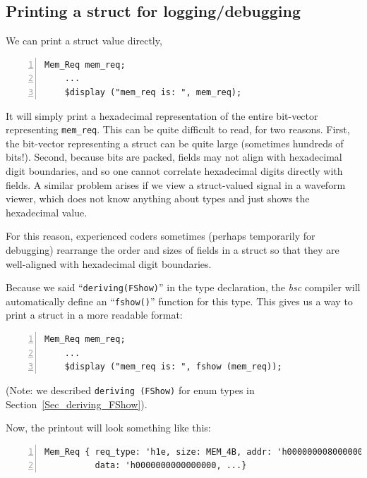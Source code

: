 
\subsection{Printing a struct for logging/debugging}

We can print a struct value directly, {\eg}

{\footnotesize
\begin{Verbatim}[frame=single, numbers=left]
    Mem_Req mem_req;
    ...
    $display ("mem_req is: ", mem_req);
\end{Verbatim}
}

It will simply print a hexadecimal representation of the entire
bit-vector representing {\tt mem\_req}.  This can be quite difficult
to read, for two reasons.  First, the bit-vector representing a struct
can be quite large (sometimes hundreds of bits!).  Second, because
bits are packed, fields may not align with hexadecimal digit
boundaries, and so one cannot correlate hexadecimal digits directly
with fields.  A similar problem arises if we view a struct-valued
signal in a waveform viewer, which does not know anything about {\BSV}
types and just shows the hexadecimal value.

For this reason, experienced {\BSV} coders sometimes (perhaps
temporarily for debugging) rearrange the order and sizes of fields in
a struct so that they are well-aligned with hexadecimal digit
boundaries.


Because we said ``\verb|deriving(FShow)|'' in the type declaration,
the \emph{bsc} compiler will automatically define an
``\verb|fshow()|'' function for this type.  This gives us a way to
print a struct in a more readable format:

{\footnotesize
\begin{Verbatim}[frame=single, numbers=left]
    Mem_Req mem_req;
    ...
    $display ("mem_req is: ", fshow (mem_req));
\end{Verbatim}
}

{\footnotesize
(Note: we described \verb|deriving (FShow)| for enum types in
Section~\ref{Sec_deriving_FShow}).}

Now, the printout will look something like this:

{\footnotesize
\begin{Verbatim}[frame=single, numbers=left]
Mem_Req { req_type: 'h1e, size: MEM_4B, addr: 'h0000000080000000,
          data: 'h0000000000000000, ...}
\end{Verbatim}
}

